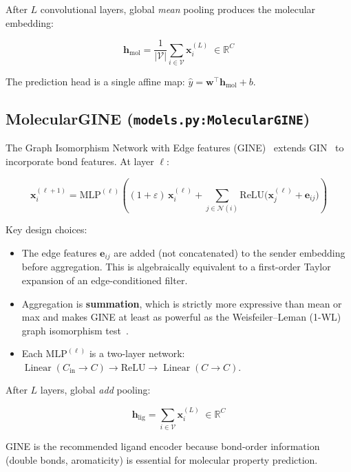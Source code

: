 \documentclass[11pt,a4paper]{article}
\newcommand{\R}{\mathbb{R}}
\newcommand{\bx}{\mathbf{x}}
\newcommand{\bh}{\mathbf{h}}
\newcommand{\be}{\mathbf{e}}
\newcommand{\ReLU}{\mathrm{ReLU}}
\newcommand{\MLP}{\mathrm{MLP}}
\newcommand{\code}[1]{\texttt{#1}}
\begin{document}
After $L$ convolutional layers, global \emph{mean} pooling produces the molecular
embedding:

\begin{equation}
\bh_{\mathrm{mol}} = \frac{1}{|\mathcal{V}|} \sum_{i \in \mathcal{V}} \bx_i^{(L)}
\;\in \R^C
\end{equation}

The prediction head is a single affine map: $\hat{y} = \mathbf{w}^\top \bh_{\mathrm{mol}} + b$.

\subsection{MolecularGINE (\code{models.py:MolecularGINE})}

The Graph Isomorphism Network with Edge features (GINE)~\cite{xu2019,hu2020}
extends GIN~\cite{xu2019} to incorporate bond features.  At layer $\ell$:

\begin{equation}
\bx_i^{(\ell+1)}
= \MLP^{(\ell)}\!\left(
    (1 + \varepsilon)\,\bx_i^{(\ell)}
    + \sum_{j \in \mathcal{N}(i)} \ReLU\!\bigl(\bx_j^{(\ell)} + \be_{ij}\bigr)
  \right)
\label{eq:gine}
\end{equation}

Key design choices:
\begin{itemize}
  \item The edge features $\be_{ij}$ are added (not concatenated) to the sender
        embedding before aggregation.  This is algebraically equivalent to a
        first-order Taylor expansion of an edge-conditioned filter.
  \item Aggregation is \textbf{summation}, which is strictly more expressive than
        mean or max and makes GINE at least as powerful as the
        Weisfeiler--Leman (1-WL) graph isomorphism test~\cite{xu2019}.
  \item Each $\MLP^{(\ell)}$ is a two-layer network:
        $\operatorname{Linear}(C_{\mathrm{in}} \to C) \to \ReLU \to
        \operatorname{Linear}(C \to C)$.
\end{itemize}

After $L$ layers, global \emph{add} pooling:

\begin{equation}
\bh_{\mathrm{lig}} = \sum_{i \in \mathcal{V}} \bx_i^{(L)} \;\in \R^C
\end{equation}

GINE is the recommended ligand encoder because bond-order information (double bonds,
aromaticity) is essential for molecular property prediction.
\end{document}
